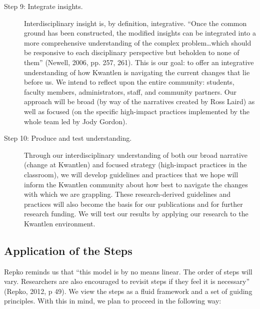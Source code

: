 \documentclass[letterpaper,10pt,headsepline]{scrreprt}
\begin{document}
\begin{description}
\item[Step 9: Integrate insights.] Interdisciplinary insight is, by
  definition, integrative. ``Once the common ground has been constructed, the
  modified insights can be integrated into a more comprehensive understanding
  of the complex problem\ldots which should be responsive to each disciplinary
  perspective but beholden to none of them'' (Newell, 2006, pp. 257, 261). This
  is our goal: to offer an integrative understanding of how Kwantlen is
  navigating the current changes that lie before us. We intend to reflect upon
  the entire community: students, faculty members, administrators, staff, and
  community partners. Our approach will be broad (by way of the narratives
  created by Ross Laird) as well as focused (on the specific high-impact
  practices implemented by the whole team led by Jody Gordon).

\item[Step 10: Produce and test understanding.]
  Through our interdisciplinary understanding of both our broad narrative
  (change at Kwantlen) and focused strategy (high-impact practices in the
  classroom), we will develop guidelines and practices that we hope will
  inform the Kwantlen community about how best to navigate the changes with
  which we are grappling. These research-derived guidelines and practices will
  also become the basis for our publications and for further research funding.
  We will test our results by applying our research to the Kwantlen
  environment.

\end{description}

\subsection{Application of the Steps}

Repko reminds us that ``this model is by no means linear. The order of steps
will vary. Researchers are also encouraged to revisit steps if they feel it is
necessary'' (Repko, 2012, p 49). We view the steps as a fluid framework and a
set of guiding principles. With this in mind, we plan to proceed in the
following way:
\end{document}
